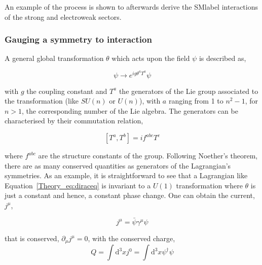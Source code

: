 An example of the process is shown to afterwards derive the \acrshort{SMlabel} interactions of the strong and electroweak sectors. 

\subsubsection{Gauging a symmetry to interaction}

A general global transformation $\theta$ which acts upon the field $\psi$ is described as,

\begin{equation}
    \psi\rightarrow e^{ig\theta^aT^a}\psi
\end{equation}

with $g$ the coupling constant and $T^a$ the generators of the Lie group associated to the transformation (like $SU(n)$ or $U(n)$), with $a$ ranging from 1 to $n^2-1$, for $n>1$, the corresponding number of the Lie algebra.
The generators can be characterised by their commutation relation, 

\begin{equation}
\label{Theory_eq:nonabcomutator}
    [T^a,T^b]=if^{abc}T^c
\end{equation}

where $f^{abc}$ are the structure constants of the group. Following Noether's theorem, there are as many conserved quantities as generators of the Lagrangian's symmetries. As an example, it is straightforward to see that a Lagrangian like
Equation~\ref{Theory_eq:diraceq} is invariant to a $U(1)$ transformation where $\theta$ is just a constant and hence, a constant phase change.
One can obtain the current, $j^\mu$,

\begin{equation}
    j^\mu = \bar{\psi}\gamma^\mu\psi
\end{equation}

that is conserved, $\partial_\mu j^\mu = 0$, with the conserved charge,
\begin{equation}
Q=\int \mathrm{d}^3x j^0 = \int \mathrm{d}^3x\psi^{\dag}\psi %
\end{equation}



